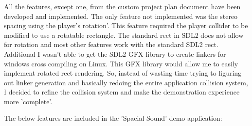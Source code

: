\documentclass{article}
\begin{document}
All the features, except one, from the custom project plan document have been developed and implemented. The only feature not implemented was the stereo spacing using the player's rotation'. This feature required the player collider to be modified to use a rotatable rectangle. The standard rect in SDL2 does not allow for rotation and most other features work with the standard SDL2 rect. Additional I wasn't able to get the SDL2 GFX library to create linkers for windows cross compiling on Linux. This GFX library would allow me to easily implement rotated rect rendering. So, instead of wasting time trying to figuring out linker generation and basically redoing the entire application collision system, I decided to refine the collision system and make the demonstration experience more 'complete'.

\medskip

The below features are included in the 'Spacial Sound' demo application:
\end{document}
